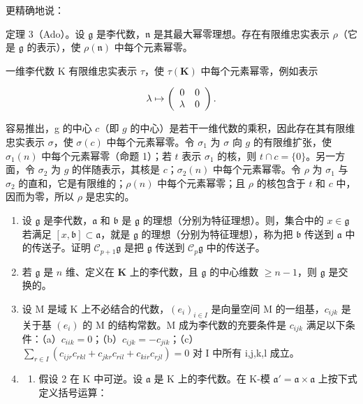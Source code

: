更精确地说：

定理 3（Ado）。设 \(\mathfrak{g}\) 是李代数，\(\mathfrak{n}\) 是其最大幂零理想。存在有限维忠实表示 \(\rho\)（它是 \(\mathfrak{g}\) 的表示），使 \(\rho(\mathfrak{n})\) 中每个元素幂零。

一维李代数 K 有限维忠实表示 \(\tau\)，使 \(\tau(\mathbf{K})\) 中每个元素幂零，例如表示

\[
\lambda \mapsto \left( \begin{array}{c c} 0 & 0 \\ \lambda & 0 \end{array} \right).
\]

容易推出，g 的中心 \(c\)（即 \(g\) 的中心）是若干一维代数的乘积，因此存在其有限维忠实表示 \(\sigma\)，使 \(\sigma(c)\) 中每个元素幂零。令 \(\sigma_1\) 为 \(\sigma\) 向 \(g\) 的有限维扩张，使 \(\sigma_1(n)\) 中每个元素幂零（命题 1）；若 \(t\) 表示 \(\sigma_1\) 的核，则 \(t \cap c = \{0\}\)。另一方面，令 \(\sigma_2\) 为 \(g\) 的伴随表示，其核是 \(c\)；\(\sigma_2(n)\) 中每个元素幂零。令 \(\rho\) 为 \(\sigma_1\) 与 \(\sigma_2\) 的直和，它是有限维的；\(\rho(n)\) 中每个元素幂零；且 \(\rho\) 的核包含于 \(t\) 和 \(c\) 中，因而为零，所以 \(\rho\) 是忠实的。



\begin{enumerate}
\def\labelenumi{\arabic{enumi}.}
\item
  设 \(\mathfrak{g}\) 是李代数，\(\mathfrak{a}\) 和 \(\mathfrak{b}\) 是 \(\mathfrak{g}\) 的理想（分别为特征理想）。则，集合中的 \(x \in \mathfrak{g}\) 若满足 \([x, \mathfrak{b}] \subset \mathfrak{a}\)，就是 \(\mathfrak{g}\) 的理想（分别为特征理想），称为把 \(\mathfrak{b}\) 传送到 \(\mathfrak{a}\) 中的传送子。证明 \(\mathcal{C}_{p+1}\mathfrak{g}\) 是把 \(\mathfrak{g}\) 传送到 \(\mathcal{C}_p\mathfrak{g}\) 中的传送子。
\item
  若 \(\mathfrak{g}\) 是 \(n\) 维、定义在 \(\mathbf{K}\) 上的李代数，且 \(\mathfrak{g}\) 的中心维数 \(\geqslant n - 1\)，则 \(\mathfrak{g}\) 是交换的。
\item
  设 M 是域 K 上不必结合的代数，\((e_{i})_{i\in I}\) 是向量空间 M 的一组基，\(c_{ijk}\) 是关于基 \((e_{i})\) 的 M 的结构常数。M 成为李代数的充要条件是 \(c_{ijk}\) 满足以下条件：（a）\(c_{iik}=0\)；（b）\(c_{ijk}=-c_{jik}\)；（c）\(\sum_{r\in I}(c_{ijr}c_{rkl}+c_{jkr}c_{ril}+c_{kir}c_{rjl})=0\) 对 I 中所有 i,j,k,l 成立。
\item
  \begin{enumerate}
  \def\labelenumii{(\alph{enumii})}
  \tightlist
  \item
    假设 2 在 K 中可逆。设 \(\mathfrak{a}\) 是 K 上的李代数。在 K-模 \(\mathfrak{a}' = \mathfrak{a} \times \mathfrak{a}\) 上按下式定义括号运算：
  \end{enumerate}
\end{enumerate}

